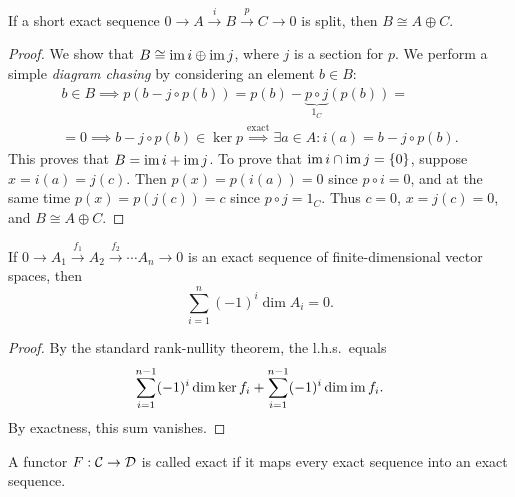 \begin{prop}
    If a short exact sequence $0\to A\overset i\to B\overset p \to C\to 0$ is split, then $B\cong A\oplus C$.
\end{prop}
\begin{proof}
    We show that $B\cong \operatorname{im} i\oplus \operatorname{im} j$, where $j$ is a section for $p$. We perform a simple \emph{diagram chasing} by considering an element $b\in B$:
    \begin{multline}
        b\in B\implies p(b-j\circ p(b))=p(b)-\underbrace{p\circ j}_{1_C}(p(b))=\\=0\implies b-j\circ p(b)\in\ker p\overset{\text{exact}}{\implies}\exists a\in A: i(a)=b-j\circ p(b).
    \end{multline}
    This proves that $B=\operatorname{im} i+\operatorname{im} j$. To prove that $\operatorname{im} i\cap \operatorname{im} j=\{0\}$, suppose $x=i(a)=j(c)$. Then $p(x)=p(i(a))=0$ since $p\circ i=0$, and at the same time $p(x)=p(j(c))=c$ since $p\circ j=1_C$. Thus $c=0$, $x=j(c)=0$, and $B\cong A\oplus C$.
\end{proof}

\begin{prop}\label{gen rank-nullity}
    If $0\to A_1\overset{f_1}\to A_2 \overset{f_2}\to\cdots A_n\to 0$ is an exact sequence of finite-dimensional vector spaces, then
    \[\sum_{i=1}^n(-1)^i \dim A_i=0.\]
\end{prop}
\begin{proof}
    By the standard rank-nullity theorem, the l.h.s.\ equals \[\sum_{i=1}^{n-1}(-1)^i\dim \ker f_i+\sum_{i=1}^{n-1}(-1)^i\dim \operatorname{im} f_i.\] By exactness, this sum vanishes.
\end{proof}


\begin{defn}
    A functor $F:\mathcal{C}\to\mathcal{D}$ is called exact if it maps every exact sequence into an exact sequence.
\end{defn}

